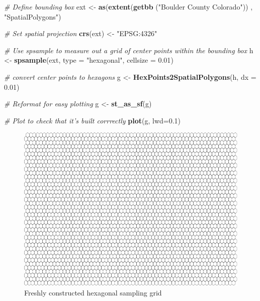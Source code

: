\documentclass[
]{article}
\newenvironment{Shaded}{\begin{snugshade}}{\end{snugshade}}
\newcommand{\CommentTok}[1]{\textcolor[rgb]{0.56,0.35,0.01}{\textit{#1}}}
\newcommand{\DataTypeTok}[1]{\textcolor[rgb]{0.13,0.29,0.53}{#1}}
\newcommand{\FloatTok}[1]{\textcolor[rgb]{0.00,0.00,0.81}{#1}}
\newcommand{\KeywordTok}[1]{\textcolor[rgb]{0.13,0.29,0.53}{\textbf{#1}}}
\newcommand{\NormalTok}[1]{#1}
\newcommand{\StringTok}[1]{\textcolor[rgb]{0.31,0.60,0.02}{#1}}
\begin{document}
\begin{Shaded}
\begin{Highlighting}[]
\CommentTok{# Define bounding box}
\NormalTok{ ext <-}\StringTok{ }\KeywordTok{as}\NormalTok{(}\KeywordTok{extent}\NormalTok{(}\KeywordTok{getbb}\NormalTok{ (}\StringTok{"Boulder County Colorado"}\NormalTok{)) , }\StringTok{"SpatialPolygons"}\NormalTok{)}

\CommentTok{# Set spatial projection}
  \KeywordTok{crs}\NormalTok{(ext) <-}\StringTok{ "EPSG:4326"}
  
\CommentTok{# Use spsample to measure out a grid of center points within the bounding box  }
\NormalTok{  h <-}\StringTok{ }\KeywordTok{spsample}\NormalTok{(ext, }\DataTypeTok{type =} \StringTok{"hexagonal"}\NormalTok{, }\DataTypeTok{cellsize =} \FloatTok{0.01}\NormalTok{)}
    
\CommentTok{# convert center points to hexagons}
\NormalTok{  g <-}\StringTok{ }\KeywordTok{HexPoints2SpatialPolygons}\NormalTok{(h, }\DataTypeTok{dx =} \FloatTok{0.01}\NormalTok{)}
  
\CommentTok{# Reformat for easy plotting}
\NormalTok{  g <-}\StringTok{ }\KeywordTok{st_as_sf}\NormalTok{(g)}
 
\CommentTok{# Plot to check that it's built corrrectly  }
  \KeywordTok{plot}\NormalTok{(g, }\DataTypeTok{lwd=}\FloatTok{0.1}\NormalTok{)}
\end{Highlighting}
\end{Shaded}

\begin{figure}
\centering
\includegraphics{Earth_Lab_application_files/figure-latex/unnamed-chunk-6-1.pdf}
\caption{Freshly constructed hexagonal sampling grid}
\end{figure}
\end{document}
